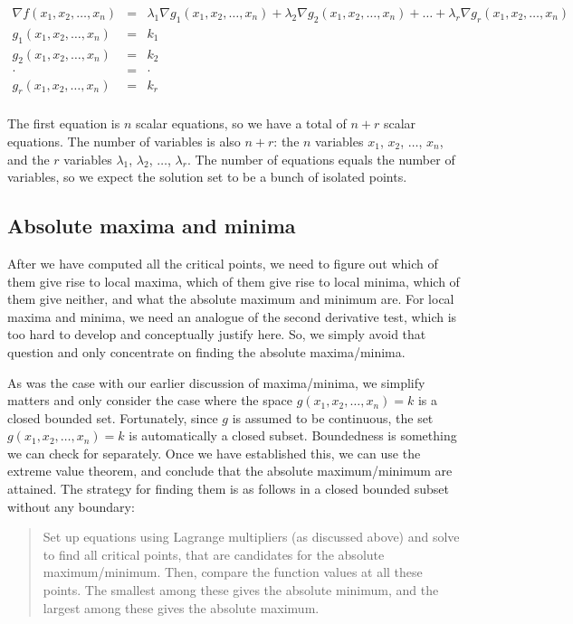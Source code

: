 \documentclass[10pt]{amsart}
\begin{document}
\begin{eqnarray*}
  \nabla f(x_1,x_2,\dots,x_n) & = & \lambda_1 \nabla g_1(x_1,x_2,\dots,x_n) + \lambda_2 \nabla g_2(x_1,x_2,\dots,x_n) + \dots + \lambda_r \nabla g_r(x_1,x_2,\dots,x_n)\\
  g_1(x_1,x_2,\dots,x_n) & = & k_1\\
  g_2(x_1,x_2,\dots,x_n) & = & k_2\\
  \cdot & = & \cdot \\
  g_r(x_1,x_2,\dots,x_n) & = & k_r \\
\end{eqnarray*}

The first equation is $n$ scalar equations, so we have a total of $n +
r$ scalar equations. The number of variables is also $n + r$: the $n$
variables $x_1$, $x_2$, $\dots$, $x_n$, and the $r$ variables
$\lambda_1$, $\lambda_2$, $\dots$, $\lambda_r$. The number of
equations equals the number of variables, so we expect the solution
set to be a bunch of isolated points.
\subsection{Absolute maxima and minima}

After we have computed all the critical points, we need to figure out
which of them give rise to local maxima, which of them give rise to
local minima, which of them give neither, and what the absolute
maximum and minimum are. For local maxima and minima, we need an
analogue of the second derivative test, which is too hard to develop
and conceptually justify here. So, we simply avoid that question and
only concentrate on finding the absolute maxima/minima.

As was the case with our earlier discussion of maxima/minima, we
simplify matters and only consider the case where the space
$g(x_1,x_2,\dots,x_n) = k$ is a closed bounded set. Fortunately, since
$g$ is assumed to be continuous, the set $g(x_1,x_2,\dots,x_n) = k$ is
automatically a closed subset. Boundedness is something we can check
for separately. Once we have established this, we can use the extreme
value theorem, and conclude that the absolute maximum/minimum are
attained. The strategy for finding them is as follows in a closed
bounded subset without any boundary:

\begin{quote}
  Set up equations using Lagrange multipliers (as discussed above) and
  solve to find all critical points, that are candidates for the
  absolute maximum/minimum. Then, compare the function values at all
  these points. The smallest among these gives the absolute minimum,
  and the largest among these gives the absolute maximum.
\end{quote}
\end{document}
